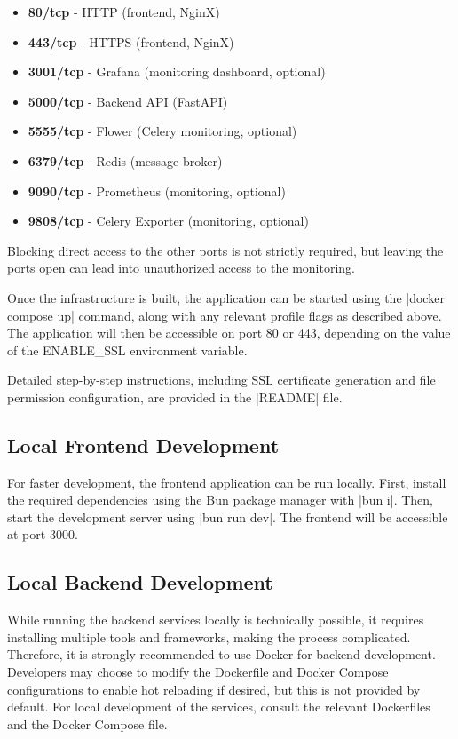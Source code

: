 \begin{itemize}
    \item \textbf{80/tcp} - HTTP (frontend, NginX)
    \item \textbf{443/tcp} - HTTPS (frontend, NginX)
    \item \textbf{3001/tcp} - Grafana (monitoring dashboard, optional)
    \item \textbf{5000/tcp} - Backend API (FastAPI)
    \item \textbf{5555/tcp} - Flower (Celery monitoring, optional)
    \item \textbf{6379/tcp} - Redis (message broker)
    \item \textbf{9090/tcp} - Prometheus (monitoring, optional)
    \item \textbf{9808/tcp} - Celery Exporter (monitoring, optional)
\end{itemize}

Blocking direct access to the other ports is not strictly required, but leaving the ports open can lead into unauthorized access to the monitoring.

Once the infrastructure is built, the application can be started using the \inline|docker compose up| command, along with any relevant profile flags as described above. The application will then be accessible on port 80 or 443, depending on the value of the ENABLE\_SSL environment variable.

Detailed step-by-step instructions, including SSL certificate generation and file permission configuration, are provided in the \inline|README| file.

\subsection{Local Frontend Development}
\label{sec:local-frontend-development}

For faster development, the frontend application can be run locally. First, install the required dependencies using the Bun package manager with \inline|bun i|. Then, start the development server using \inline|bun run dev|. The frontend will be accessible at port 3000.

\subsection{Local Backend Development}
\label{sec:local-backend-development}

While running the backend services locally is technically possible, it requires installing multiple tools and frameworks, making the process complicated. Therefore, it is strongly recommended to use Docker for backend development. Developers may choose to modify the Dockerfile and Docker Compose configurations to enable hot reloading if desired, but this is not provided by default. For local development of the services, consult the relevant Dockerfiles and the Docker Compose file.
